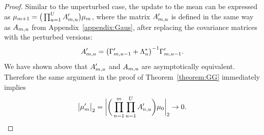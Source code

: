 \documentclass[12pt]{article}\usepackage[]{graphicx}\usepackage[]{xcolor}
\begin{document}
\begin{appendices}
\begin{proof}
Similar to the unperturbed case, the update to the mean can be expressed as $\mu_{m+1} = \big(\prod_{u = 1}^UA'_{m, u}\big)\mu_m$, where the matrix $A'_{m, u}$ is defined in the same way as $A_{m, u}$ from Appendix~\ref{appendix:Gaus}, after replacing the covariance matrices with the perturbed versions:
$$
A'_{m, u} = \big(\Gamma'_{m, u - 1} + \Lambda^*_u\big)^{-1}\Gamma'_{m, u - 1}.
$$
We have shown above that $A'_{m, u}$ and $A_{m, u}$ are asymptotically equivalent.
Therefore the same argument in the proof of Theorem~\ref{theorem:GG} immediately implies
$$
\big| \mu'_{m} \big|_2 =
  \bigg|
    \bigg(
      \prod_{n = 1}^m\prod_{u = 1}^U A'_{n, u}
    \bigg)
    \mu_0
  \bigg|_2 \rightarrow 0.
$$

   \end{proof}




\end{appendices}
\end{document}
